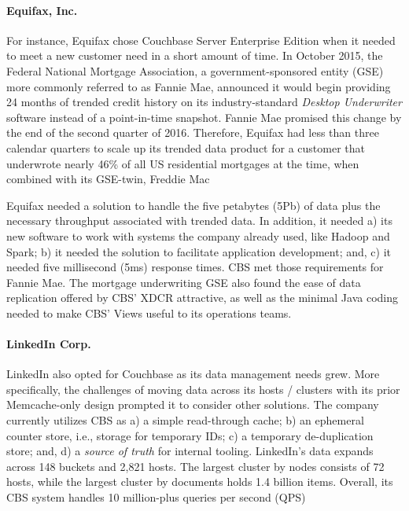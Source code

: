 \documentclass[9pt,twocolumn,twoside]{../../styles/osajnl}
\begin{document}
\paragraph{Equifax, Inc.}
For instance, Equifax chose Couchbase Server Enterprise Edition when it needed to meet a new customer need in a short amount of time.  In October 2015, the Federal National Mortgage Association, a government-sponsored entity (GSE) more commonly referred to as Fannie Mae, announced it would begin providing 24 months of trended credit history on its industry-standard \textit{Desktop Underwriter} software instead of a point-in-time snapshot.  Fannie Mae promised this change by the end of the second quarter of 2016.  Therefore, Equifax had less than three calendar quarters to scale up its trended data product for a customer that underwrote nearly 46\% of all US residential mortgages at the time, when combined with its GSE-twin, Freddie Mac \cite{www-trendeddata-equifax,www-gsemktshare-valuewalk}

Equifax needed a solution to handle the five petabytes (5Pb) of data plus the necessary throughput associated with trended data.  In addition, it needed a) its new software to work with systems the company already used, like Hadoop and Spark; b) it needed the solution to facilitate application development; and, c) it needed five millisecond (5ms) response times.  CBS met those requirements for Fannie Mae.  The mortgage underwriting GSE also found the ease of data replication offered by CBS' XDCR attractive, as well as the minimal Java coding needed to make CBS' Views useful to its operations teams. 
\cite{www-fanniemae-equifax-couchbaseconnect}

\paragraph{LinkedIn Corp.}
LinkedIn also opted for Couchbase as its data management needs grew.  More specifically, the challenges of moving data across its hosts / clusters with its prior Memcache-only design prompted it to consider other solutions.  The company currently utilizes CBS as a) a simple read-through cache; b) an ephemeral counter store, i.e., storage for temporary IDs; c) a temporary de-duplication store; and, d) a \textit{source of truth} for internal tooling.  LinkedIn's data expands across 148 buckets and 2,821 hosts.  The largest cluster by nodes consists of 72 hosts, while the largest cluster by documents holds 1.4 billion items.  Overall, its CBS system handles 10 million-plus queries per second (QPS) \cite{www-linkedin-couchbaseconnect}
\end{document}
